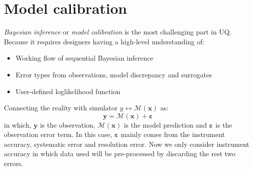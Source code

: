 \documentclass{ol-softwaremanual}
\begin{document}
\section{Model calibration}
\textit{Bayesian inference} or \textit{model calibration} is the most challenging part in UQ. Because it requires designers having a high-level understanding of:
\begin{itemize}
    \item Working flow of sequential Bayesian inference 
    \item Error types from observations, model discrepancy and surrogates
    \item User-defined loglikelihood function
\end{itemize}

Connecting the reality with simulator $y \leftrightarrow \mathcal{M}(\boldsymbol{x})$ as: 
\begin{equation*}
\boldsymbol{y} = \mathcal{M}(\boldsymbol{x})
+ \boldsymbol{\varepsilon}
\end{equation*}
in which, $\boldsymbol{y}$ is the observation, $\mathcal{M}(\boldsymbol{x})$ is the model prediction and $\boldsymbol{\varepsilon}$ is the observation error term. In this case, $\boldsymbol{\varepsilon}$ mainly comes from the instrument accuracy, systematic error and resolution error. Now we only consider instrument accuracy in which data used will be pre-processed by discarding the rest two errors.
\end{document}
